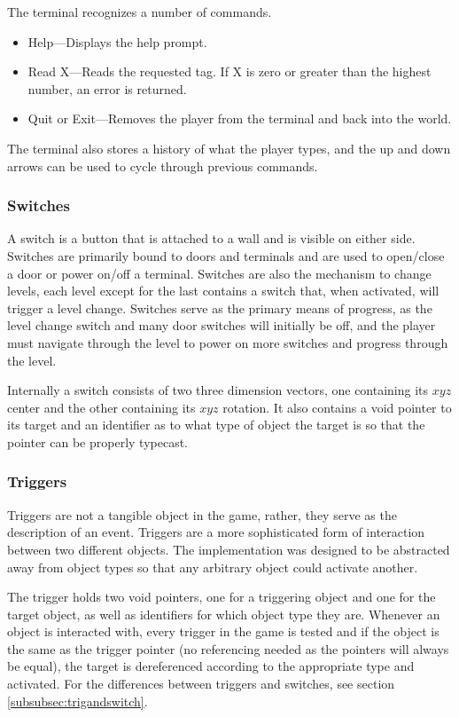 \documentclass{article}
\begin{document}
The terminal recognizes a number of commands.

\begin{itemize}
	\item Help---Displays the help prompt.
	\item Read X---Reads the requested tag. If X is zero or greater than the highest number, an error is returned.
	\item Quit or Exit---Removes the player from the terminal and back into the world.
\end{itemize}

The terminal also stores a history of what the player types, and the up and down arrows can be used to cycle through previous commands.

\subsubsection{Switches} \label{subsubsec:switch}

A switch is a button that is attached to a wall and is visible on either side. Switches are primarily bound to doors and terminals and are used to open/close a door or power on/off a terminal. Switches are also the mechanism to change levels, each level except for the last contains a switch that, when activated, will trigger a level change. Switches serve as the primary means of progress, as the level change switch and many door switches will initially be off, and the player must navigate through the level to power on more switches and progress through the level.

Internally a switch consists of two three dimension vectors, one containing its $xyz$ center and the other containing its $xyz$ rotation. It also contains a void pointer to its target and an identifier as to what type of object the target is so that the pointer can be properly typecast.

\subsubsection{Triggers} \label{subsubsec:Triggers}

Triggers are not a tangible object in the game, rather, they serve as the description of an event. Triggers are a more sophisticated form of interaction between two different objects. The implementation was designed to be abstracted away from object types so that any arbitrary object could activate another. 

The trigger holds two void pointers, one for a triggering object and one for the target object, as well as identifiers for which object type they are. Whenever an object is interacted with, every trigger in the game is tested and if the object is the same as the trigger pointer (no referencing needed as the pointers will always be equal), the target is dereferenced according to the appropriate type and activated. For the differences between triggers and switches, see section \ref{subsubsec:trigandswitch}.
\end{document}
